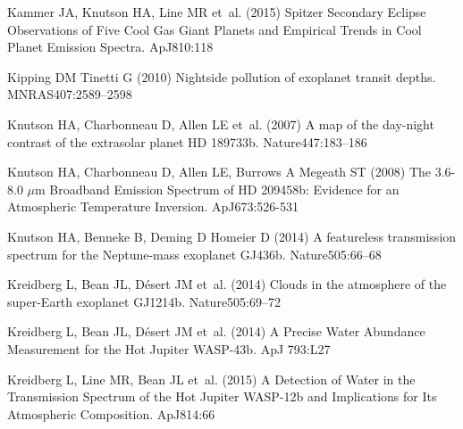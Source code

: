\documentclass[graybox,natbib,nosecnum]{svmult}
\newcommand*\apj{ApJ}
\newcommand*\apjl{ApJ}
\newcommand*\mnras{MNRAS}
\newcommand*\nat{Nature}
\begin{document}
\begin{thebibliography}{110}
{Kammer} JA, {Knutson} HA, {Line} MR et~al. (2015) {Spitzer Secondary Eclipse
  Observations of Five Cool Gas Giant Planets and Empirical Trends in Cool
  Planet Emission Spectra}. \apj 810:118

{Kipping} DM {Tinetti} G (2010) {Nightside pollution of exoplanet transit
  depths}. \mnras 407:2589--2598

{Knutson} HA, {Charbonneau} D, {Allen} LE et~al. (2007) {A map of the day-night
  contrast of the extrasolar planet HD 189733b}. \nat 447:183--186

{Knutson} HA, {Charbonneau} D, {Allen} LE, {Burrows} A {Megeath} ST (2008) {The
  3.6-8.0 {$\mu$}m Broadband Emission Spectrum of HD 209458b: Evidence for an
  Atmospheric Temperature Inversion}. \apj 673:526-531

{Knutson} HA, {Benneke} B, {Deming} D {Homeier} D (2014) {A featureless
  transmission spectrum for the Neptune-mass exoplanet GJ436b}. \nat 505:66--68

{Kreidberg} L, {Bean} JL, {D{\'e}sert} JM et~al. (2014{}) {Clouds
  in the atmosphere of the super-Earth exoplanet GJ1214b}. \nat 505:69--72

{Kreidberg} L, {Bean} JL, {D{\'e}sert} JM et~al. (2014{}) {A
  Precise Water Abundance Measurement for the Hot Jupiter WASP-43b}. \apjl
  793:L27

{Kreidberg} L, {Line} MR, {Bean} JL et~al. (2015) {A Detection of Water in the
  Transmission Spectrum of the Hot Jupiter WASP-12b and Implications for Its
  Atmospheric Composition}. \apj 814:66


\end{thebibliography}
\end{document}
